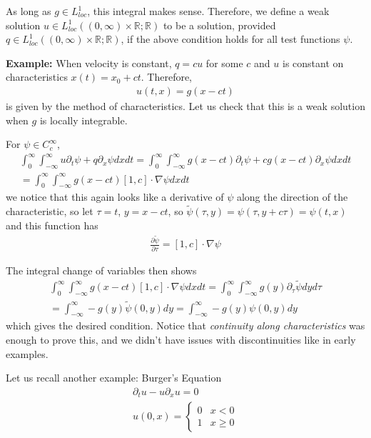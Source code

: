 \documentclass{article}
\newcommand{\R}{{\mathbb{R}}}
\newcommand{\pd}{\partial}
\newcommand{\CC}{C_{c}^{\infty}}
\begin{document}
	As long as $g \in L_{loc}^{1}$, this integral makes sense. Therefore, we define a weak solution $u \in L^{1}_{loc}((0,\infty) \times \R; \R)$ to be a solution, provided $q \in L_{loc}^{1}((0,\infty) \times \R;\R)$, if the above condition holds for all test functions $\psi$. 
	
	\vspace{0.25 cm}
	
	\textbf{Example:} When velocity is constant, $q = c u$ for some $c$ and $u$ is constant on characteristics $x(t) = x_0 + ct$. Therefore, 
	\begin{align*}
		u(t,x) = g(x-ct)
	\end{align*}
	is given by the method of characteristics. Let us check that this is a weak solution when $g$ is locally integrable. 
	
	For $\psi \in \CC$, 
	\begin{align*}
		\int_{0}^{\infty} \int_{-\infty}^{\infty} u \pd_{t} \psi + q \pd_{x} \psi dx dt = \int_{0}^{\infty} \int_{-\infty}^{\infty} g(x-ct) \pd_{t} \psi + cg(x-ct) \pd_{x} \psi dx dt \\
		= \int_{0}^{\infty} \int_{-\infty}^{\infty} g(x-ct) [1,c] \cdot \nabla \psi dx dt
	\end{align*}
	we notice that this again looks like a derivative of $\psi$ along the direction of the characteristic, so let $\tau = t$, $y = x-ct$, so $\tilde{\psi}(\tau,y) = \psi(\tau,y+c\tau) = \psi(t,x)$ and this function has 
	\begin{align*}
		\frac{\pd \tilde{\psi}}{\pd \tau} = [1,c] \cdot \nabla \psi
	\end{align*}
	
	The integral change of variables then shows 
	\begin{align*}
		\int_{0}^{\infty} \int_{-\infty}^{\infty} g(x-ct) [1,c] \cdot \nabla \psi dx dt = \int_{0}^{\infty} \int_{-\infty}^{\infty} g(y) \pd_{\tau} \tilde{\psi} dy d\tau \\
		= \int_{-\infty}^{\infty} -g(y) \tilde{\psi}(0,y) dy  = \int_{-\infty}^{\infty} -g(y) \psi(0,y) dy
	\end{align*}
	which gives the desired condition. Notice that \textit{continuity along characteristics} was enough to prove this, and we didn't have issues with discontinuities like in early examples. 
	\vspace{0.25 cm}
	
	Let us recall another example: Burger's Equation
	\begin{align*}
		\pd_{t}u - u \pd_{x}u = 0 \\
		u(0,x) = \begin{cases}
			0 & x < 0 \\
			1 & x \geq 0
		\end{cases}
	\end{align*}
	
\end{document}
